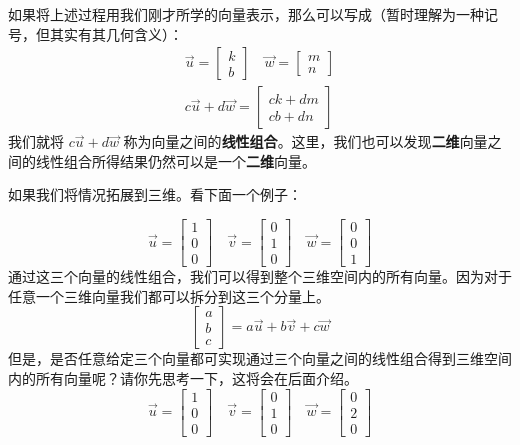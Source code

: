如果将上述过程用我们刚才所学的向量表示，那么可以写成（暂时理解为一种记号，但其实有其几何含义）：
$$
\begin{aligned}
	\vec u =\begin{bmatrix}k\\b\end{bmatrix}\quad \vec w=\begin{bmatrix}m\\n\end{bmatrix}\\
	c\vec u+d\vec w=\begin{bmatrix}ck+dm\\cb+dn\end{bmatrix}
\end{aligned}
$$
我们就将 $c\vec u+d\vec w$ 称为向量之间的\textbf{线性组合}。这里，我们也可以发现\textbf{二维}向量之间的线性组合所得结果仍然可以是一个\textbf{二维}向量。

如果我们将情况拓展到三维。看下面一个例子：

$$
\vec u=\begin{bmatrix}1\\0\\0\end{bmatrix}
\quad
\vec v=\begin{bmatrix}0\\1\\0\end{bmatrix}
\quad
\vec w=\begin{bmatrix}0\\0\\1\end{bmatrix}
$$
通过这三个向量的线性组合，我们可以得到整个三维空间内的所有向量。因为对于任意一个三维向量我们都可以拆分到这三个分量上。
$$
\begin{bmatrix}a\\b\\c\end{bmatrix}=a\vec u+b\vec v+c\vec w
$$
但是，是否任意给定三个向量都可实现通过三个向量之间的线性组合得到三维空间内的所有向量呢？请你先思考一下，这将会在后面介绍。
$$
\vec u=\begin{bmatrix}1\\0\\0\end{bmatrix}
\quad
\vec v=\begin{bmatrix}0\\1\\0\end{bmatrix}
\quad
\vec w=\begin{bmatrix}0\\2\\0\end{bmatrix}
$$